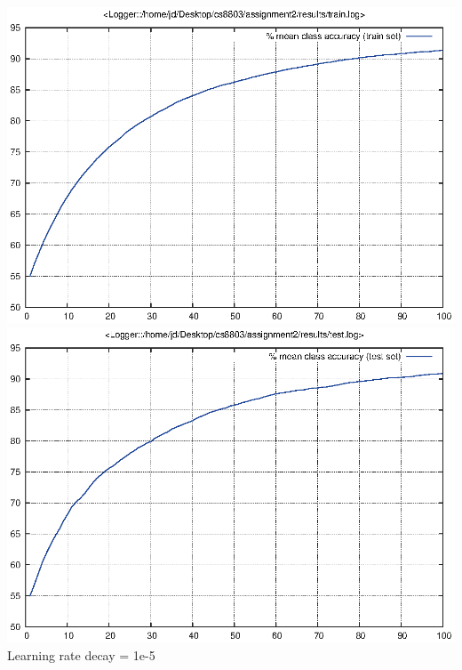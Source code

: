 \documentclass[twoside,12pt]{article}
\newcommand{\imsize}{0.5\linewidth}
\begin{document}
\includegraphics[width=\imsize]{assignment2/results/sgd_r4_train}
\includegraphics[width=\imsize]{assignment2/results/sgd_r4_test}
Learning rate decay = 1e-5
\end{document}
